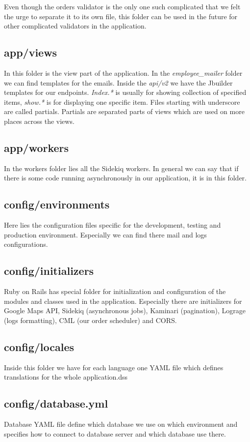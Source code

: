 		Even though the orders validator is the only one such complicated that we felt the urge to separate it to its own file, this folder can be used in the future for other complicated validators in the application.
		  
	\subsection{app/views}
		In this folder is the view part of the application.  In the \textit{employee\_mailer} folder we can find templates for the emails. Inside the \textit{api/v2} we have the Jbuilder templates for our endpoints. \textit{Index.*} is usually for showing collection of specified items, \textit{show.*} is for displaying one specific item. Files starting with underscore are called partials. Partials are separated parts of views which are used on more places across the views.
	\subsection{app/workers}
		In the workers folder lies all the Sidekiq workers. In general we can say that if there is some code running asynchronously in our application, it is in this folder. 
	\subsection{config/environments}
		Here lies the configuration files specific for the development, testing and production environment. Especially we can find there mail and logs configurations. 
	\subsection{config/initializers}
		Ruby on Rails has special folder for initialization and configuration of the modules and classes used in the application. Especially there are initializers for Google Maps API, Sidekiq (asynchronous jobs), Kaminari (pagination), Lograge (logs formatting), CML (our order scheduler) and CORS.
	\subsection{config/locales}
		Inside this folder we have for each language one YAML file which defines translations for the whole application.dss
	\subsection{config/database.yml}
		Database YAML file define which database we use on which environment and specifies how to connect to database server and which database use there.
